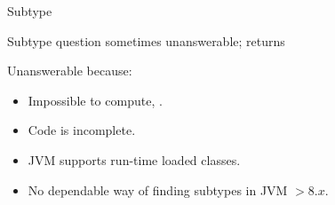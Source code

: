 \begin{frame}{Subtype}

  Subtype question sometimes unanswerable;  returns 

  \usebox\subtypebox

  Unanswerable because:
  \begin{itemize}
  \item Impossible to compute, \eg {}.
  \item Code is incomplete.
  \item JVM supports run-time loaded classes.
  \item No dependable way of finding subtypes in JVM $> 8.x$.
  \end{itemize}

\end{frame}

